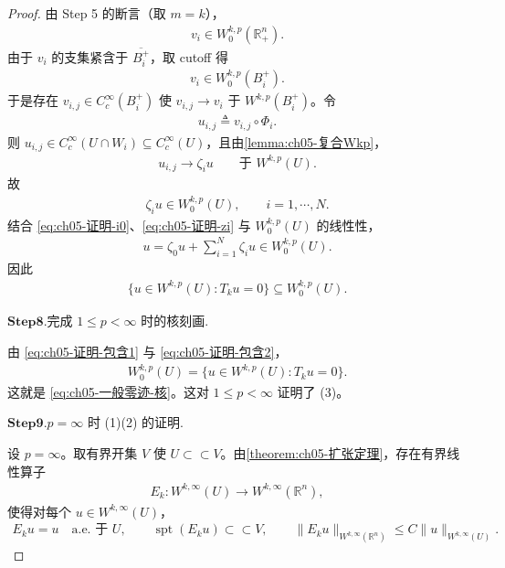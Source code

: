 \documentclass[../../main.tex]{subfiles}%
\begin{document}
\begin{proof}
由 Step 5 的断言（取 $m=k$），
\begin{align*}
v_{i}\in W^{k,p}_{0}(\mathbb{R}^{n}_{+}).
\end{align*}
由于 $v_{i}$ 的支集紧含于 $\overline{B_{i}^{+}}$，取 cutoff 得
\begin{align}
v_{i}\in W^{k,p}_{0}(B_{i}^{+}).
\label{eq:ch05-证明-vi}
\end{align}
于是存在 $v_{i,j}\in C^{\infty}_{c}(B_{i}^{+})$ 使 $v_{i,j}\to v_{i}$ 于 $W^{k,p}(B_{i}^{+})$。令
\begin{align*}
u_{i,j}\triangleq v_{i,j}\circ\Phi_{i}.
\end{align*}
则 $u_{i,j}\in C^{\infty}_{c}(U\cap W_{i})\subseteq C^{\infty}_{c}(U)$，且由\cref{lemma:ch05-复合Wkp}，
\begin{align*}
u_{i,j}\longrightarrow\zeta_{i}u
\qquad\text{于 }W^{k,p}(U).
\end{align*}
故
\begin{align}
\zeta_{i}u\in W^{k,p}_{0}(U),
\qquad i=1,\cdots,N.
\label{eq:ch05-证明-zi}
\end{align}
结合 \eqref{eq:ch05-证明-i0}、\eqref{eq:ch05-证明-zi} 与 $W^{k,p}_{0}(U)$ 的线性性，
\begin{align*}
u=\zeta_{0}u+\sum_{i=1}^{N}\zeta_{i}u\in W^{k,p}_{0}(U).
\end{align*}
因此
\begin{align}
\{u\in W^{k,p}(U):T_{k}u=0\}\subseteq W^{k,p}_{0}(U).
\label{eq:ch05-证明-包含2}
\end{align}

\noindent$\mathbf{Step}\mathbf{8}.${\heiti 完成 $1\leqslant p<\infty$ 时的核刻画.}

由 \eqref{eq:ch05-证明-包含1} 与 \eqref{eq:ch05-证明-包含2}，
\begin{align*}
W^{k,p}_{0}(U)=\{u\in W^{k,p}(U):T_{k}u=0\}.
\end{align*}
这就是 \eqref{eq:ch05-一般零迹-核}。这对 $1\leqslant p<\infty$ 证明了 (3)。

\noindent$\mathbf{Step}\mathbf{9}.${\heiti $p=\infty$ 时 (1)(2) 的证明.}

设 $p=\infty$。取有界开集 $V$ 使 $U\subset\subset V$。由\cref{theorem:ch05-扩张定理}，存在有界线性算子
\begin{align*}
E_{k}:W^{k,\infty}(U)\longrightarrow W^{k,\infty}(\mathbb{R}^{n}),
\end{align*}
使得对每个 $u\in W^{k,\infty}(U)$，
\begin{align*}
E_{k}u=u\quad\text{a.e. 于 }U,
\qquad
\operatorname{spt}(E_{k}u)\subset\subset V,
\qquad
\|E_{k}u\|_{W^{k,\infty}(\mathbb{R}^{n})}\leqslant C\|u\|_{W^{k,\infty}(U)}.
\end{align*}


\end{proof}
\end{document}
